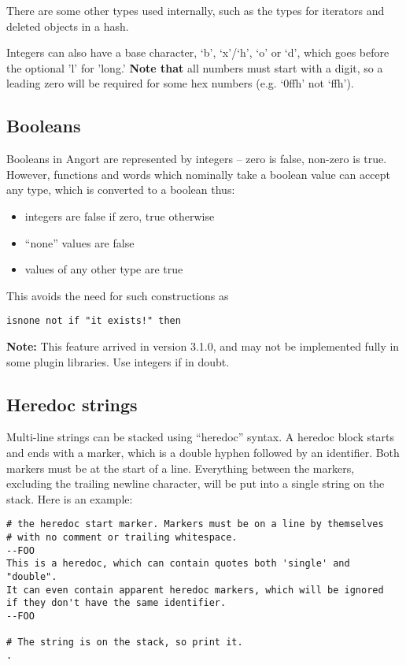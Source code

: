 There are some other types used internally, such as the
types for iterators and deleted objects in a hash.

Integers can also have a base character, `b', `x'/`h', `o' or `d', which
goes before the optional 'l' for 'long.' \textbf{Note that} all numbers
must start with a digit, so a leading zero will be required for some 
hex numbers (e.g. `0ffh' not `ffh').

\subsection{Booleans}
Booleans in Angort are represented by integers -- zero is false, non-zero
is true. However, functions and words which nominally take a boolean value can
accept any type, which is converted to a boolean thus:
\begin{itemize}
\item integers are false if zero, true otherwise
\item ``none'' values are false
\item values of any other type are true
\end{itemize}
This avoids the need for such constructions as
\begin{lstlisting}
isnone not if "it exists!" then
\end{lstlisting}
\textbf{Note:} This feature arrived in version 3.1.0, and may not
be implemented fully in some plugin libraries. Use integers if in doubt.

\subsection{Heredoc strings}
\label{heredoc}
Multi-line strings can be stacked 
using ``heredoc'' syntax. A heredoc block starts and ends with a marker,
which is a double hyphen followed by an identifier. Both markers
must be at the start of a line. Everything between
the markers, excluding the trailing newline character, will be put into
a single string on the stack. Here is an example:
\begin{lstlisting}
# the heredoc start marker. Markers must be on a line by themselves
# with no comment or trailing whitespace.
--FOO
This is a heredoc, which can contain quotes both 'single' and "double".
It can even contain apparent heredoc markers, which will be ignored
if they don't have the same identifier.
--FOO

# The string is on the stack, so print it.
.
\end{lstlisting}


